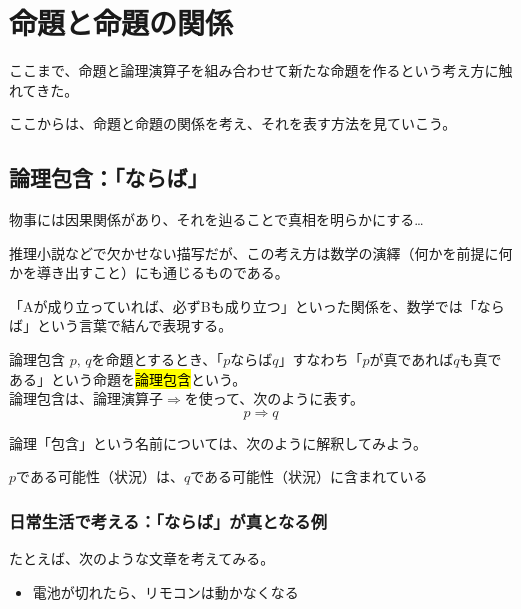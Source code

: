 \documentclass[../../imaging-math]{subfiles}
\begin{document}
\section{命題と命題の関係}

ここまで、命題と論理演算子を組み合わせて新たな命題を作るという考え方に触れてきた。

ここからは、命題と命題の関係を考え、それを表す方法を見ていこう。

\subsection{論理包含：「ならば」}

物事には因果関係があり、それを辿ることで真相を明らかにする…

推理小説などで欠かせない描写だが、この考え方は数学の演繹（何かを前提に何かを導き出すこと）にも通じるものである。

\br

「Aが成り立っていれば、必ずBも成り立つ」といった関係を、数学では「ならば」という言葉で結んで表現する。

\begin{definition}{論理包含}
  \titlegap
  $p,\,q$を命題とするとき、「$p$ならば$q$」すなわち「$p$が真であれば$q$も真である」という命題を\hl{論理包含}という。\\
  論理包含は、論理演算子$\Rightarrow$を使って、次のように表す。
  \LARGE
  \begin{equation*}
    p \Rightarrow q
  \end{equation*}
\end{definition}

論理「包含」という名前については、次のように解釈してみよう。

\begin{emphabox}
  \begin{spacebox}
    \begin{center}
      $p$である可能性（状況）は、$q$である可能性（状況）に含まれている
    \end{center}
  \end{spacebox}
\end{emphabox}

\subsubsection{日常生活で考える：「ならば」が真となる例}

たとえば、次のような文章を考えてみる。

\begin{itemize}
  \item 電池が切れたら、リモコンは動かなくなる
\end{itemize}
\end{document}
